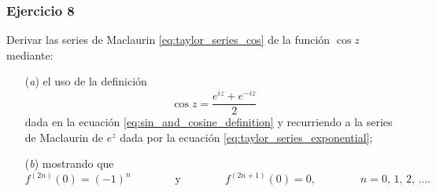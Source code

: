 \documentclass[a4paper]{report}
\begin{document}
\subsubsection*{Ejercicio 8}

Derivar las series de Maclaurin \ref{eq:taylor_series_cos} de la función \(\cos z\) mediante:
\begin{enumerate}
 \item[(\textit{a})] el uso de la definición 
 \[
  \cos z=\frac{e^{iz}+e^{-iz}}{2}
 \]
 dada en la ecuación \ref{eq:sin_and_cosine_definition} y recurriendo a la series de Maclaurin de \(e^z\) dada por la ecuación \ref{eq:taylor_series_exponential};
 \item[(\textit{b})] mostrando que 
 \[
  f^{(2n)}(0)=(-1)^n
  \qquad\qquad\textrm{y}\qquad\qquad
  f^{(2n+1)}(0)=0,
  \qquad\qquad 
  n=0,\,1,\,2,\,\dots.
 \]
\end{enumerate}
\end{document}
